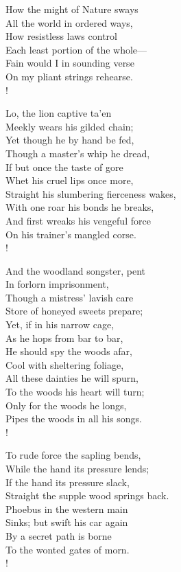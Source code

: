 \documentclass[12pt]{book}
\newenvironment{ipoem}[1]%
  {\setcounter{poemindentevery}{#1}\begin{poem}\small}%
  {\end{poem}\setcounter{poemindentevery}{0}}
\begin{document}
\begin{ipoem}{0}
    How the might of Nature sways \\
    All the world in ordered ways, \\
    How resistless laws control \\
    Each least portion of the whole--- \\
    Fain would I in sounding verse \\
    On my pliant strings rehearse. \\!

    Lo, the lion captive ta'en \\
    Meekly wears his gilded chain; \\
    Yet though he by hand be fed, \\
    Though a master's whip he dread, \\
    If but once the taste of gore \\
    Whet his cruel lips once more, \\
    Straight his slumbering fierceness wakes, \\
    With one roar his bonds he breaks, \\
    And first wreaks his vengeful force \\
    On his trainer's mangled corse. \\!

    And the woodland songster, pent \\
    In forlorn imprisonment, \\
    Though a mistress' lavish care \\
    Store of honeyed sweets prepare; \\
    Yet, if in his narrow cage, \\
    As he hops from bar to bar, \\
    He should spy the woods afar, \\
    Cool with sheltering foliage, \\
    All these dainties he will spurn, \\
    To the woods his heart will turn; \\
    Only for the woods he longs, \\
    Pipes the woods in all his songs. \\!

    To rude force the sapling bends, \\
    While the hand its pressure lends; \\
    If the hand its pressure slack, \\
    Straight the supple wood springs back. \\
    Phoebus in the western main \\
    Sinks; but swift his car again \\
    By a secret path is borne \\
    To the wonted gates of morn. \\!


\end{ipoem}
\end{document}
